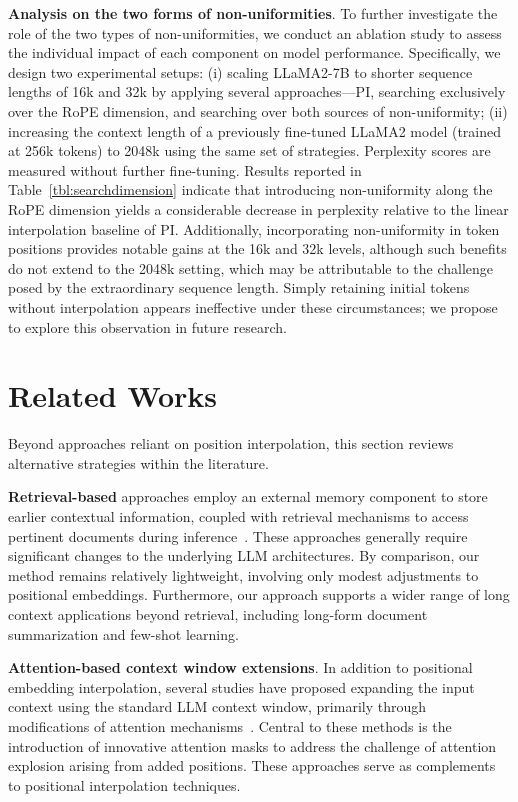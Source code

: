 \textbf{Analysis on the two forms of non-uniformities}. To further investigate the role of the two types of non-uniformities, we conduct an ablation study to assess the individual impact of each component on model performance. Specifically, we design two experimental setups: (i) scaling LLaMA2-7B to shorter sequence lengths of 16k and 32k by applying several approaches—PI, searching exclusively over the RoPE dimension, and searching over both sources of non-uniformity; (ii) increasing the context length of a previously fine-tuned LLaMA2 model (trained at 256k tokens) to 2048k using the same set of strategies. Perplexity scores are measured without further fine-tuning. Results reported in Table~\ref{tbl:searchdimension} indicate that introducing non-uniformity along the RoPE dimension yields a considerable decrease in perplexity relative to the linear interpolation baseline of PI. Additionally, incorporating non-uniformity in token positions provides notable gains at the 16k and 32k levels, although such benefits do not extend to the 2048k setting, which may be attributable to the challenge posed by the extraordinary sequence length. Simply retaining initial tokens without interpolation appears ineffective under these circumstances; we propose to explore this observation in future research.

\section{Related Works}

Beyond approaches reliant on position interpolation, this section reviews alternative strategies within the literature.

\textbf{Retrieval-based} approaches employ an external memory component to store earlier contextual information, coupled with retrieval mechanisms to access pertinent documents during inference~\cite{longllama,wang2023augmenting,borgeaud2022improving}. These approaches generally require significant changes to the underlying LLM architectures. By comparison, our method remains relatively lightweight, involving only modest adjustments to positional embeddings. Furthermore, our approach supports a wider range of long context applications beyond retrieval, including long-form document summarization and few-shot learning.

\textbf{Attention-based context window extensions}. In addition to positional embedding interpolation, several studies have proposed expanding the input context using the standard LLM context window, primarily through modifications of attention mechanisms~\cite{han2023lminfinite, streamingllm,parallelwindow}. Central to these methods is the introduction of innovative attention masks to address the challenge of attention explosion arising from added positions. These approaches serve as complements to positional interpolation techniques.

